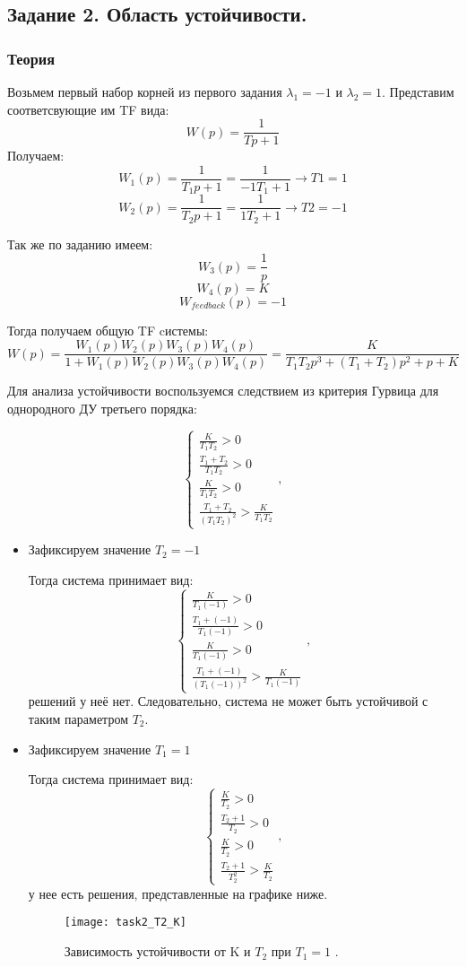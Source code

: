 \documentclass[16pt]{article}
\begin{document}
\newpage
\subsection{Задание 2. Область устойчивости. }
\subsubsection{Теория}
Возьмем первый набор корней из первого задания \(\lambda_1 = -1\) и \(\lambda_2 = 1\).
Представим соответсвующие им TF вида:
\[W(p) = \frac{1}{Tp + 1}\]
Получаем:
\[W_1(p) = \frac{1}{T_1p + 1} = \frac{1}{-1T_1 + 1} \rightarrow T1 = 1\]
\[W_2(p) = \frac{1}{T_2p + 1} = \frac{1}{1T_2 + 1} \rightarrow T2 = -1\]

Так же по заданию имеем:
\[W_3(p) = \frac{1}{p}\]
\[W_4(p) = K\]
\[W_{feedback}(p) = -1\]

Тогда получаем общую TF cистемы:
\[W(p) = \frac{W_1(p)W_2(p)W_3(p)W_4(p)}{1 + W_1(p)W_2(p)W_3(p)W_4(p)} = \frac{K}{T_1T_2p^3 + (T_1+T_2)p^2+p+K}\]

Для анализа устойчивости воспользуемся следствием из критерия Гурвица для однородного ДУ третьего порядка:

\[
    \begin{cases}
        \frac{K}{T_1T_2} > 0 \\
        \frac{T_1+T_2}{T_1T_2} > 0\\ 
        \frac{K}{T_1T_2} > 0\\ 
        \frac{T_1+T_2}{(T_1T_2)^2} > \frac{K}{T_1T_2}
    \end{cases},
\]

\begin{itemize}
    \item Зафиксируем значение \(T_2 = -1\)
    
    Тогда система принимает вид: 
    \[
    \begin{cases}
        \frac{K}{T_1(-1)} > 0 \\
        \frac{T_1+(-1)}{T_1(-1)} > 0\\ 
        \frac{K}{T_1(-1)} > 0\\ 
        \frac{T_1+(-1)}{(T_1(-1))^2} > \frac{K}{T_1(-1)}
    \end{cases},
    \]
    решений у неё нет. Следовательно, система не может быть устойчивой с таким параметром \(T_2\).

    \item Зафиксируем значение \(T_1 = 1\)
    
    Тогда система принимает вид: 
    \[
    \begin{cases}
        \frac{K}{T_2} > 0 \\
        \frac{T_2+1}{T_2} > 0\\ 
        \frac{K}{T_2} > 0\\ 
        \frac{T_2+1}{T_2^2} > \frac{K}{T_2}
    \end{cases},
    \]
    у нее есть решения, представленные на графике ниже.
    \begin{figure}[H]
        \centering
        \texttt{[image: task2\_T2\_K]}
        \caption{Зависимость устойчивости от K и \(T_2\) при \(T_1 = 1\) .}
        \label{fig:fig4}
    \end{figure}
\end{itemize}
\newpage
\end{document}
